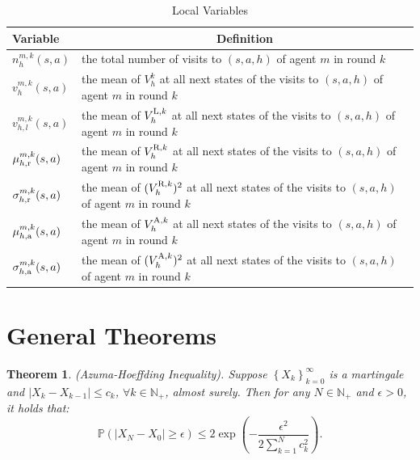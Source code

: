 \documentclass{article}
\newtheorem{theorem}{Theorem}[section]
\newcommand{\LL}{\textnormal{L}}
\newcommand{\R}{\textnormal{R}}
\newcommand{\nr}{\textnormal{r}}
\newcommand{\A}{\textnormal{A}}
\newcommand{\na}{\textnormal{a}}
\begin{document}
\begin{table}[H]
\caption{Local Variables}
\vspace{0.5em}
\renewcommand{\arraystretch}{1.27}
\begin{tabular}{|>{\centering\arraybackslash}m{1.5cm}|m{11.5cm}|}
\hline
Variable& \multicolumn{1}{c|}{Definition} \\ \hline
$n_h^{m,k}(s,a)$ &  the total number of visits to $(s,a,h)$ of agent $m$ in round $k$\\ \hline
$v_h^{m,k}(s,a)$ &  the mean of $V_h^k$ at all next states of the visits to $(s,a,h)$ of agent $m$ in round $k$\\ \hline
$v_{h,l}^{m,k}(s,a)$ &  the mean of $V_h^{\LL,k}$ at all next states of the visits to $(s,a,h)$ of agent $m$ in round $k$\\ \hline
$\mu_{h,\nr}^{m,k}(s,a)$ &  the mean of $V_h^{\R,k}$ at all next states of the visits to $(s,a,h)$ of agent $m$ in round $k$\\ \hline
$\sigma_{h,\nr}^{m,k}(s,a)$ &  the mean of $(V_h^{\R,k})^2$ at all next states of the visits to $(s,a,h)$ of agent $m$ in round $k$\\ \hline
$\mu_{h,\na}^{m,k}(s,a)$ &  the mean of $V_h^{\A,k}$ at all next states of the visits to $(s,a,h)$ of agent $m$ in round $k$\\ \hline
$\sigma_{h,\na}^{m,k}(s,a)$ &  the mean of $(V_h^{\A,k})^2$ at all next states of the visits to $(s,a,h)$ of agent $m$ in round $k$\\ \hline
\end{tabular}
\end{table}

\section{General Theorems}
\label{technical}
\begin{theorem}
\label{Hoeffding}
\textnormal{(Azuma-Hoeffding Inequality).} Suppose {$\left\{X_k\right\}_{k=0}^\infty$} is a martingale and $|X_k-X_{k-1}|\leq c_k$, $\forall k\in\mathbb{N}_+$, almost surely. Then for any $N \in \mathbb{N}_+$ and $\epsilon >0$, it holds that:
$$\mathbb{P}\left(|X_N-X_{0}|\geq \epsilon\right) \leq 2\exp \left(-\frac{\epsilon^2}{2\sum_{k=1}^{N}c_k^2}\right).$$
\end{theorem}
\end{document}
